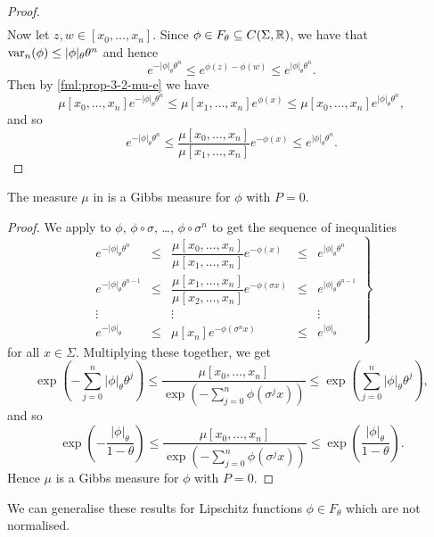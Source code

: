 \begin{proposition}
\begin{proof}
\begin{align}
		\end{align}
		Now let $z, w \in [x_0, \dots, x_n]$. Since $\phi \in F_\theta \subseteq C(\Sigma, \mathbb{R})$, we have that $\operatorname{var}_n(\phi) \leq |\phi|_\theta \theta^n$ and hence
		\[
			e^{-|\phi|_\theta \theta^n} \leq e^{\phi(z) - \phi(w)} \leq e^{|\phi|_\theta \theta^n}.
		\]
		Then by \eqref{fml:prop-3-2-mu-e} we have
		\[
			\mu[x_0, \dots, x_n] e^{-|\phi|_\theta \theta^n} \leq \mu[x_1, \dots, x_n] e^{\phi(x)} \leq \mu[x_0, \dots, x_n] e^{|\phi|_\theta \theta^n},
		\]
		and so
		\[
			e^{-|\phi|_\theta \theta^n} \leq \frac{\mu[x_0, \dots, x_n]}{\mu[x_1, \dots, x_n]} e^{-\phi(x)} \leq e^{|\phi|_\theta \theta^n}.
		\]
	\end{proof}
\end{proposition}

\begin{corollary} \label{cor:pp-3-2-1}
	The measure $\mu$ in  is a Gibbs measure for $\phi$ with $P = 0$.
	\begin{proof}
		We apply  to $\phi$, $\phi \circ \sigma$, \dots, $\phi \circ \sigma^n$ to get the sequence of inequalities
		\[
			\left.
			\begin{matrix}
				e^{-|\phi|_\theta \theta^n} &\leq& \dfrac{\mu[x_0, \dots, x_n]}{\mu[x_1, \dots, x_n]} e^{-\phi(x)} &\leq& e^{|\phi|_\theta \theta^n} \\
				e^{-|\phi|_\theta \theta^{n - 1}} &\leq& \dfrac{\mu[x_1, \dots, x_n]}{\mu[x_2, \dots, x_n]} e^{-\phi(\sigma{x})} &\leq& e^{|\phi|_\theta \theta^{n - 1}} \\
				\vdots & & \vdots & & \vdots \\
				e^{-|\phi|_\theta} &\leq& \mu[x_n] e^{-\phi(\sigma^n{x})} &\leq& e^{|\phi|_\theta}
			\end{matrix}
			\right\}
		\]
		for all $x \in \Sigma$. Multiplying these together, we get
		\[
			\exp\left(-\sum_{j = 0}^n{|\phi|_\theta \theta^j}\right) \leq \frac{\mu[x_0, \dots, x_n]}{\exp\left(-\sum_{j = 0}^n{\phi(\sigma^j{x})}\right)} \leq \exp\left(\sum_{j = 0}^n{|\phi|_\theta \theta^j}\right),
		\]
		and so
		\[
			\exp\left(-\frac{|\phi|_\theta}{1 - \theta}\right) \leq \frac{\mu[x_0, \dots, x_n]}{\exp\left(-\sum_{j = 0}^n{\phi(\sigma^j{x})}\right)} \leq \exp\left(\frac{|\phi|_\theta}{1 - \theta}\right).
		\]
		Hence $\mu$ is a Gibbs measure for $\phi$ with $P = 0$.
	\end{proof}
\end{corollary}

We can generalise these results for Lipschitz functions $\phi \in F_\theta$ which are not normalised.

